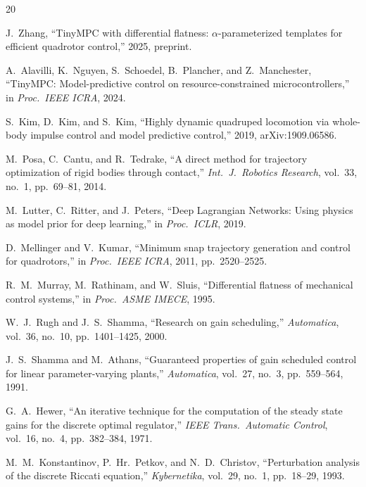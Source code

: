 \documentclass[letterpaper, 10pt, conference]{IEEEtran}
\begin{document}

\begin{thebibliography}{20}

J.~Zhang,
``TinyMPC with differential flatness:
$\alpha$-parameterized templates for efficient quadrotor control,''
2025, preprint.

A.~Alavilli, K.~Nguyen, S.~Schoedel, B.~Plancher, and Z.~Manchester,
``TinyMPC: Model-predictive control on resource-constrained
microcontrollers,''
in \emph{Proc.\ IEEE ICRA}, 2024.

S.~Kim, D.~Kim, and S.~Kim,
``Highly dynamic quadruped locomotion via whole-body impulse control
and model predictive control,''
2019, arXiv:1909.06586.

M.~Posa, C.~Cantu, and R.~Tedrake,
``A direct method for trajectory optimization of rigid bodies
through contact,''
\emph{Int.\ J.\ Robotics Research}, vol.~33, no.~1,
pp.~69--81, 2014.

M.~Lutter, C.~Ritter, and J.~Peters,
``Deep Lagrangian Networks: Using physics as model prior for
deep learning,''
in \emph{Proc.\ ICLR}, 2019.

D.~Mellinger and V.~Kumar,
``Minimum snap trajectory generation and control for quadrotors,''
in \emph{Proc.\ IEEE ICRA}, 2011, pp.~2520--2525.

R.~M.~Murray, M.~Rathinam, and W.~Sluis,
``Differential flatness of mechanical control systems,''
in \emph{Proc.\ ASME IMECE}, 1995.

W.~J.~Rugh and J.~S.~Shamma,
``Research on gain scheduling,''
\emph{Automatica}, vol.~36, no.~10, pp.~1401--1425, 2000.

J.~S.~Shamma and M.~Athans,
``Guaranteed properties of gain scheduled control for linear
parameter-varying plants,''
\emph{Automatica}, vol.~27, no.~3, pp.~559--564, 1991.

G.~A.~Hewer,
``An iterative technique for the computation of the steady state
gains for the discrete optimal regulator,''
\emph{IEEE Trans.\ Automatic Control}, vol.~16, no.~4,
pp.~382--384, 1971.

M.~M.~Konstantinov, P.~Hr.~Petkov, and N.~D.~Christov,
``Perturbation analysis of the discrete Riccati equation,''
\emph{Kybernetika}, vol.~29, no.~1, pp.~18--29, 1993.


\end{thebibliography}
\end{document}

